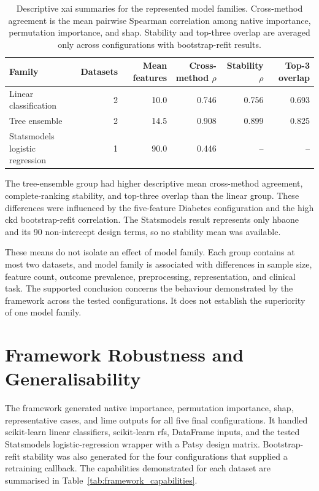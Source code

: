 \begin{table}[H]
    \centering
    \small
    \caption{Descriptive \gls{xai} summaries for the represented model families. Cross-method agreement is the mean pairwise Spearman correlation among native importance, permutation importance, and \gls{shap}. Stability and top-three overlap are averaged only across configurations with bootstrap-refit results.}
    \label{tab:model_family_results}
    \begin{tabularx}{\textwidth}{@{}>{\RaggedRight\arraybackslash}Xrrrrr@{}}
        \toprule
        \textbf{Family} & \textbf{Datasets} & \textbf{Mean features} & \textbf{Cross-method $\rho$} & \textbf{Stability $\rho$} & \textbf{Top-3 overlap} \\
        \midrule
        Linear classification & 2 & 10.0 & 0.746 & 0.756 & 0.693 \\
        Tree ensemble & 2 & 14.5 & 0.908 & 0.899 & 0.825 \\
        Statsmodels logistic regression & 1 & 90.0 & 0.446 & -- & -- \\
        \bottomrule
    \end{tabularx}
\end{table}

The tree-ensemble group had higher descriptive mean cross-method agreement, complete-ranking stability, and top-three overlap than the linear group. These differences were influenced by the five-feature Diabetes configuration and the high \gls{ckd} bootstrap-refit correlation. The Statsmodels result represents only \gls{hbaone} and its 90 non-intercept design terms, so no stability mean was available.

These means do not isolate an effect of model family. Each group contains at most two datasets, and model family is associated with differences in sample size, feature count, outcome prevalence, preprocessing, representation, and clinical task. The supported conclusion concerns the behaviour demonstrated by the framework across the tested configurations. It does not establish the superiority of one model family.

\section{Framework Robustness and Generalisability}

The framework generated native importance, permutation importance, \gls{shap}, representative cases, and \gls{lime} outputs for all five final configurations. It handled scikit-learn linear classifiers, scikit-learn \glspl{rf}, DataFrame inputs, and the tested Statsmodels logistic-regression wrapper with a Patsy design matrix. Bootstrap-refit stability was also generated for the four configurations that supplied a retraining callback. The capabilities demonstrated for each dataset are summarised in Table~\ref{tab:framework_capabilities}.


